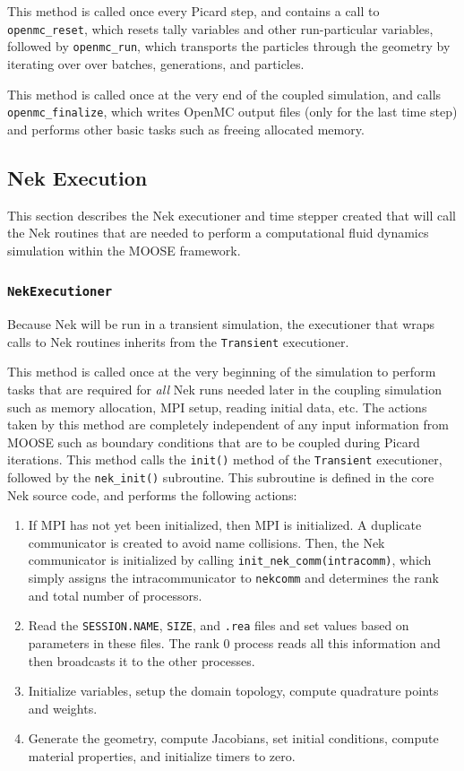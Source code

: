 \documentclass[10pt]{article}
\newcounter{subsubsubsection}[subsubsection]
\numberwithin{equation}{section} %
\begin{document}
This method is called once every Picard step, and contains a call to {\tt openmc\_reset}, which resets tally variables and other run-particular variables, followed by {\tt openmc\_run}, which transports the particles through the geometry by iterating over over batches, generations, and particles. 

This method is called once at the very end of the coupled simulation, and calls {\tt openmc\_finalize}, which writes OpenMC output files (only for the last time step) and performs other basic tasks such as freeing allocated memory.

\subsection{Nek Execution}
This section describes the Nek executioner and time stepper created that will call the Nek routines that are needed to perform a computational fluid dynamics simulation within the MOOSE framework.

\subsubsection{{\tt NekExecutioner}}
Because Nek will be run in a transient simulation, the executioner that wraps calls to Nek routines inherits from the {\tt Transient} executioner.

This method is called once at the very beginning of the simulation to perform tasks that are required for {\it all} Nek runs needed later in the coupling simulation such as memory allocation, MPI setup, reading initial data, etc. The actions taken by this method are completely independent of any input information from MOOSE such as boundary conditions that are to be coupled during Picard iterations. This method calls the {\tt init()} method of the {\tt Transient} executioner, followed by the {\tt nek\_init()} subroutine. This subroutine is defined in the core Nek source code, and performs the following actions:

\begin{enumerate}
\item If MPI has not yet been initialized, then MPI is initialized. A duplicate communicator is created to avoid name collisions. Then, the Nek communicator is initialized by calling {\tt init\_nek\_comm(intracomm)}, which simply assigns the intracommunicator to {\tt nekcomm} and determines the rank and total number of processors.
\item Read the {\tt SESSION.NAME}, {\tt SIZE}, and {\tt .rea} files and set values based on parameters in these files. The rank 0 process reads all this information and then broadcasts it to the other processes.
\item Initialize variables, setup the domain topology, compute quadrature points and weights.
\item Generate the geometry, compute Jacobians, set initial conditions, compute material properties, and initialize timers to zero.
\end{enumerate}
\end{document}
